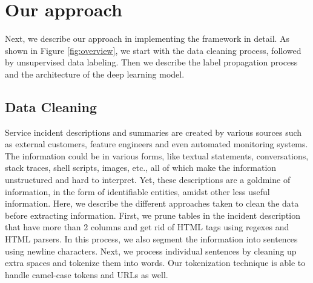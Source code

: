 \section{Our approach}
Next, we describe our approach in implementing the \softner{} framework in detail. As shown in Figure \ref{fig:overview}, we start with the data cleaning process, followed by unsupervised data labeling. Then we describe the label propagation process and the architecture of the deep learning model.

\subsection{Data Cleaning}
Service incident descriptions and summaries are created by various sources such as external customers, feature engineers and even automated monitoring systems. The information could be in various forms, like textual statements, conversations, stack traces, shell scripts, images,  etc., all of which make the information unstructured and hard to interpret. Yet, these descriptions are a goldmine of information, in the form of identifiable entities, amidst other less useful information. Here, we describe the different approaches taken to clean the data before extracting information. First, we prune tables in the incident description that have more than 2 columns and get rid of HTML tags using regexes and HTML parsers. In this process, we also segment the information into sentences using newline characters. Next, we process individual sentences by cleaning up extra spaces and tokenize them into words. Our tokenization technique is able to handle camel-case tokens and URLs as well.

